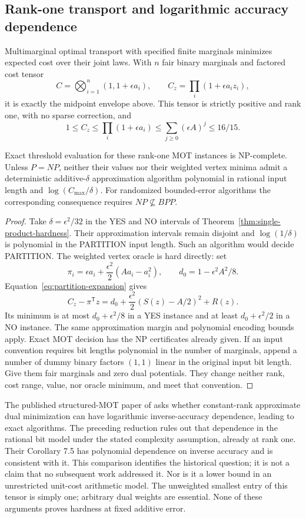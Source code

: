 \subsection{Rank-one transport and logarithmic accuracy dependence}
Multimarginal optimal transport with specified finite marginals minimizes
expected cost over their joint laws. With $n$ fair binary marginals and
factored cost tensor
\[
 C=\bigotimes_{i=1}^n(1,1+\epsilon a_i),\qquad
 C_z=\prod_i(1+\epsilon a_i z_i),
\]
it is exactly the midpoint envelope above. This tensor is strictly
positive and rank one, with no sparse correction, and
\[
 1\le C_z\le\prod_i(1+\epsilon a_i)
       \le\sum_{j\ge0}(\epsilon A)^j\le16/15.
\]
\begin{corollary}
\label{cor:rank-one-precision}
Exact threshold evaluation for these rank-one MOT instances is
NP-complete. Unless $P=NP$, neither their values nor their weighted
vertex minima admit a deterministic additive-$\delta$ approximation
algorithm polynomial in rational input length and
$\log(C_{\max}/\delta)$. For randomized bounded-error algorithms the
corresponding consequence requires $NP\not\subseteq BPP$.
\end{corollary}
\begin{proof}
Take $\delta=\epsilon^2/32$ in the YES and NO intervals of
Theorem~\ref{thm:single-product-hardness}. Their approximation intervals
remain disjoint and $\log(1/\delta)$ is polynomial in the PARTITION
input length. Such an algorithm would decide PARTITION.
The weighted vertex oracle is hard directly: set
\[
 \pi_i=\epsilon a_i+\frac{\epsilon^2}{2}(Aa_i-a_i^2),\qquad
 d_0=1-\epsilon^2A^2/8.
\]
Equation~\eqref{eq:partition-expansion} gives
\[
 C_z-\pi^{\mathsf T}z=d_0+\frac{\epsilon^2}{2}(S(z)-A/2)^2+R(z).
\]
Its minimum is at most $d_0+\epsilon^2/8$ in a YES instance and at
least $d_0+\epsilon^2/2$ in a NO instance. The same approximation margin
and polynomial encoding bounds apply. Exact MOT decision has the
NP certificates already given. If an input convention requires bit
lengths polynomial in the number of marginals, append a number of dummy
binary factors $(1,1)$ linear in the original input bit length. Give
them fair marginals and zero dual potentials. They change neither
rank, cost range, value, nor oracle minimum, and meet that convention.
\end{proof}

The published structured-MOT paper of \citet[Section 7.2, after
Theorem 7.4]{AltschulerBoixAdsera2023} asks whether constant-rank
approximate dual minimization can have logarithmic inverse-accuracy
dependence, leading to exact algorithms. The preceding reduction rules
out that dependence in the rational bit model under the stated
complexity assumption, already at rank one. Their Corollary 7.5 has
polynomial dependence on inverse accuracy and is consistent with it.
This comparison identifies the historical question; it is not a claim
that no subsequent work addressed it. Nor is it a lower bound in an
unrestricted unit-cost arithmetic model. The unweighted smallest entry
of this tensor is simply one; arbitrary dual weights are essential.
None of these arguments proves hardness at fixed additive error.

